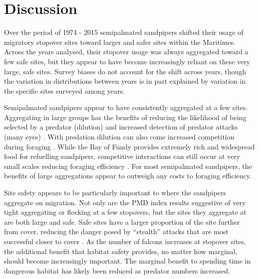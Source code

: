 \section{Discussion}

Over the period of 1974 - 2015 semipalmated sandpipers shifted their usage of migratory stopover sites toward larger and safer sites within the Maritimes. Across the years analysed, their stopover usage was always aggregated toward a few safe sites, but they appear to have become increasingly reliant on these very large, safe sites. Survey biases do not account for the shift across years, though the variation in distributions between years is in part explained by variation in the specific sites surveyed among years.

Semipalmated sandpipers appear to have consistently aggregated at a few sites. Aggregating in large groups has the benefits of reducing the likelihood of being selected by a predator (dilution) and increased detection of predator attacks (many eyes) \citep{Roberts1996,Bednekoff1998,Fernandez-Juricic2007,Pays2013}. With predation dilution can also come increased competition during foraging \citep{Stillman1997,Vahl2005,Minderman2006c}. While the Bay of Fundy provides extremely rich and widespread food for refuelling sandpipers, competitive interactions can still occur at very small scales reducing foraging efficiency \citep{Vahl2005a,Beauchamp2009a,Beauchamp2014}. For most semipalmated sandpipers, the benefits of large aggregations appear to outweigh any costs to foraging efficiency.

Site safety appears to be particularly important to where the sandpipers aggregate on migration. Not only are the PMD index results suggestive of very tight aggregating or flocking at a few stopovers, but the sites they aggregate at are both large and safe. Safe sites have a larger proportion of the site further from cover, reducing the danger posed by ``stealth'' attacks that are most successful closer to cover \citep{dekker_raptor_2004}. As the number of falcons increases at stopover sites, the additional benefit that habitat safety provides, no matter how marginal, should become increasingly important. The marginal benefit to spending time in dangerous habitat has likely been reduced as predator numbers increased.

